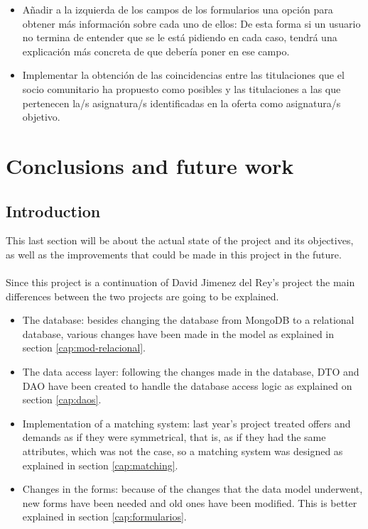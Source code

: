 \documentclass[11pt]{book}
\begin{document}
\begin{itemize}
		\item Añadir a la izquierda de los campos de los formularios una opción para obtener más información sobre cada uno de ellos: De esta forma si un usuario no termina de entender que se le está pidiendo en cada caso, tendrá una explicación más concreta de que debería poner en ese campo.
		\item Implementar la obtención de las coincidencias entre las titulaciones que el socio comunitario ha propuesto como posibles y las titulaciones a las que pertenecen la/s asignatura/s identificadas en la oferta como asignatura/s objetivo.
	\end{itemize}
	
	
	\chapter{Conclusions and future work}
	\section{Introduction}
	This last section will be about the actual state of the project and its objectives, as well as the improvements that could be made in this project in the future.\\\\
	Since this project is a continuation of David Jimenez del Rey's project the main differences between the two projects are going to be explained.
	\begin{itemize}
		\item The database: besides changing the database from MongoDB to a relational database, various changes have been made in the model as explained in section \ref{cap:mod-relacional}.
		\item The data access layer: following the changes made in the database, DTO and DAO have been created to handle the database access logic as explained on section \ref{cap:daos}.
		\item Implementation of a matching system: last year's project treated offers and demands as if they were symmetrical, that is, as if they had the same attributes, which was not the case, so a matching system was designed as explained in section \ref{cap:matching}.
		\item Changes in the forms: because of the changes that the data model underwent, new forms have been needed and old ones have been modified. This is better explained in section \ref{cap:formularios}.
	\end{itemize}
	
\end{document}
